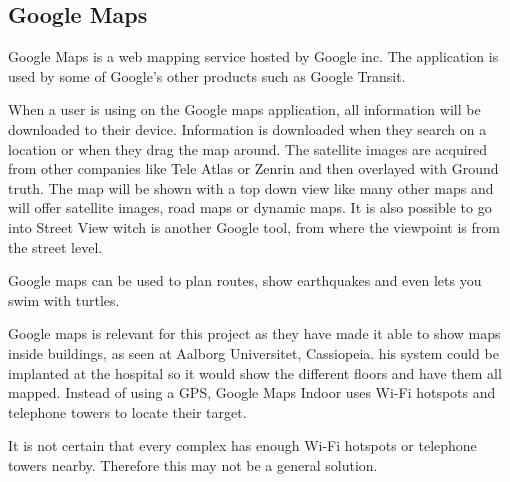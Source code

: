 \subsection{Google Maps}
Google Maps is a web mapping service hosted by Google inc. The application is used by some of Google's other products such as Google Transit\cite{Goo_transist}. 

When a user is using on the Google maps application, all information will be downloaded to their device. Information is downloaded when they search on a location or when they drag the map around\cite{Goo_input}. The satellite images are acquired from other companies like Tele Atlas\cite{Goo_Tele} or Zenrin\cite{Goo_Zenrin} and then overlayed with Ground truth\cite{Goo_GT}.
The map will be shown with a top down view like many other maps and will offer satellite images, road maps or dynamic maps. It is also possible to go into Street View witch is another Google tool, from where the viewpoint is from the street level\cite{Goo_street}.

Google maps can be used to plan routes, show earthquakes and even lets you swim with turtles\cite{Goo_Turtle}.

Google maps is relevant for this project as they have made it able to show maps inside buildings, as seen at Aalborg Universitet, Cassiopeia\cite{Goo_Indoor}. his system could be implanted at the hospital so it would show the different floors and have them all mapped. Instead of using a GPS, Google Maps Indoor uses Wi-Fi hotspots and telephone towers to locate their target\cite{Goo_Indoor}.

It is not certain that every complex has enough Wi-Fi hotspots or telephone towers nearby. Therefore this may not be a general solution.